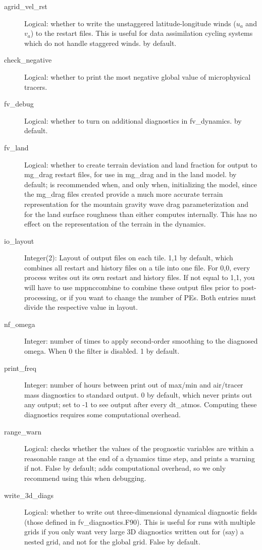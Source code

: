 \documentclass[12pt,letterpaper]{book}
\begin{document}
\begin{description}

\item[agrid\_vel\_rst] Logical: whether to write the unstaggered latitude-longitude winds ($u_a$ and $v_a$) to the restart files. This is useful for data assimilation cycling systems which do not handle staggered winds. \false  by default.

\item[check\_negative] Logical: whether to print the most negative global value of microphysical tracers.


\item[fv\_debug] Logical: whether to turn on additional diagnostics in fv\_dynamics. \false  by default. 


\item[fv\_land] Logical: whether to create terrain deviation and land fraction for output to mg\_drag restart files, for use in mg\_drag and in the land model. \false  by default; \true  is recommended when, and only when, initializing the model, since the mg\_drag files created provide a much more accurate terrain representation for the mountain gravity wave drag parameterization and for the land surface roughness than either computes internally. This has no effect on the representation of the terrain in the dynamics. 


\item[io\_layout] Integer(2): Layout of output files on each tile. 
1,1 by default, which combines all restart and history files on a tile into one file. For 
0,0, every process writes out its own restart and history files. If not equal to 
1,1, you will have to use mppnccombine to combine these output files prior to post-processing, or if you want to change the number of PEs. Both entries must divide the respective value in layout.


\item[nf\_omega] Integer: number of times to apply second-order smoothing to the diagnosed omega. When 
0 the filter is disabled. 1 by default. 


\item[print\_freq] Integer: number of hours between print out of max/min and air/tracer mass diagnostics to standard output. 
0 by default, which never prints out any output; set to -1 to see output after every dt\_atmos. Computing these diagnostics requires some computational overhead. 


\item[range\_warn] Logical: checks whether the values of the prognostic variables are within a 
reasonable range at the end of a dynamics time step, and prints a warning if not. False by default; adds computational overhead, so we only recommend using this when debugging. 

\item[write\_3d\_diags] Logical: whether to write out three-dimensional dynamical diagnostic fields (those defined in fv\_diagnostics.F90). This is useful for runs with multiple grids if you only want very large 3D diagnostics written out for (say) a nested grid, and not for the global grid. False by default. 

\end{description}
\end{document}
